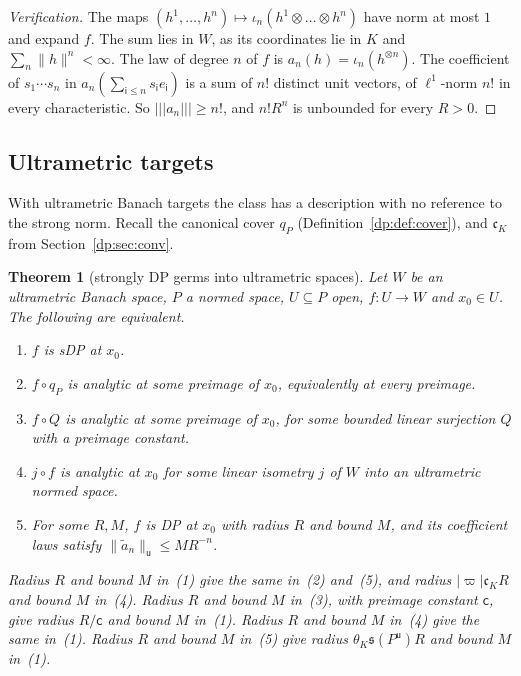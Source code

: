 \documentclass[11pt]{amsart}
\newtheorem{theorem}{Theorem}[section]
\theoremstyle{definition}
\theoremstyle{remark}
\numberwithin{equation}{section}
\newcommand{\abs}[1]{\lvert #1\rvert}
\newcommand{\norm}[1]{\lVert #1\rVert}
\theoremstyle{plain}
\theoremstyle{definition}
\theoremstyle{plain}
\begin{document}
\begin{proof}[Verification]
The maps $(h^1,\dots,h^n)\mapsto\iota_n(h^1\otimes\dots\otimes h^n)$ have norm at most $1$ and expand $f$. The sum lies in $W$, as its coordinates lie in $K$ and $\sum_n\norm h^n<\infty$. The law of degree $n$ of $f$ is $a_n(h)=\iota_n(h^{\otimes n})$. The coefficient of $s_1\cdots s_n$ in $a_n(\sum_{\mathsf i\le n}s_{\mathsf i}e_{\mathsf i})$ is a sum of $n!$ distinct unit vectors, of $\ell^1$-norm $n!$ in every characteristic. So $\lvert\!\lvert\!\lvert a_n\rvert\!\rvert\!\rvert\ge n!$, and $n!R^n$ is unbounded for every $R>0$.
\end{proof}

\subsection{Ultrametric targets}\label{dp:s:ssec-targets}

With ultrametric Banach targets the class has a description with no reference to the strong norm. Recall the canonical cover $q_P$ (Definition~\ref{dp:def:cover}), and $\mathfrak c_K$ from Section~\ref{dp:sec:conv}.

\begin{theorem}[strongly DP germs into ultrametric spaces]\label{dp:thm:strong-um}
Let $W$ be an ultrametric Banach space, $P$ a normed space, $U\subseteq P$ open, $f\colon U\to W$ and $x_0\in U$. The following are equivalent.
\begin{enumerate}
\item $f$ is sDP at $x_0$.
\item $f\circ q_P$ is analytic at some preimage of $x_0$, equivalently at every preimage.
\item $f\circ Q$ is analytic at some preimage of $x_0$, for some bounded linear surjection $Q$ with a preimage constant.
\item $j\circ f$ is analytic at $x_0$ for some linear isometry $j$ of $W$ into an ultrametric normed space.
\item For some $R,M$, $f$ is DP at $x_0$ with radius $R$ and bound $M$, and its coefficient laws satisfy $\norm{\tilde a_n}_{\mathsf u}\le MR^{-n}$.
\end{enumerate}
Radius $R$ and bound $M$ in~\textup{(1)} give the same in~\textup{(2)} and~\textup{(5)}, and radius $\abs\varpi\mathfrak c_KR$ and bound $M$ in~\textup{(4)}. Radius $R$ and bound $M$ in~\textup{(3)}, with preimage constant $\mathsf c$, give radius $R/\mathsf c$ and bound $M$ in~\textup{(1)}. Radius $R$ and bound $M$ in~\textup{(4)} give the same in~\textup{(1)}. Radius $R$ and bound $M$ in~\textup{(5)} give radius $\theta_K\mathfrak s(P^{\mathsf u})R$ and bound $M$ in~\textup{(1)}.
\end{theorem}
\end{document}
